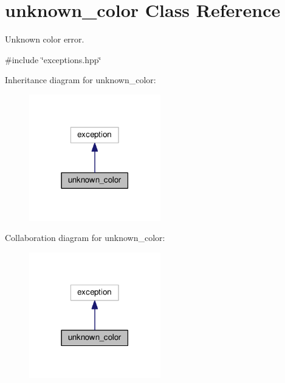 \hypertarget{classunknown__color}{}\section{unknown\+\_\+color Class Reference}
\label{classunknown__color}


Unknown color error.  




{\ttfamily \#include \char`\"{}exceptions.\+hpp\char`\"{}}



Inheritance diagram for unknown\+\_\+color\+:\nopagebreak
\begin{figure}[H]
\begin{center}
\leavevmode
\includegraphics[width=162pt]{classunknown__color__inherit__graph}
\end{center}
\end{figure}


Collaboration diagram for unknown\+\_\+color\+:\nopagebreak
\begin{figure}[H]
\begin{center}
\leavevmode
\includegraphics[width=162pt]{classunknown__color__coll__graph}
\end{center}
\end{figure}
